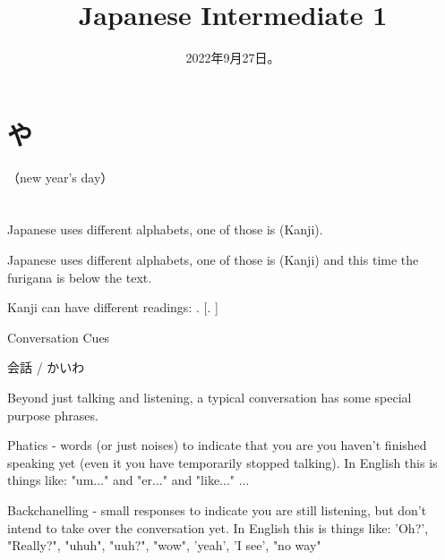 \documentclass[44pt, oneside]{article}   	%
\title{Japanese Intermediate 1}
\date{ \fg{漢字}{かんじ} 2022年9月27日。}
\newcommand{\TUG}{\TeX\ Users Group}
\begin{document}
\maketitle{}

\section*{\protect {}や}

（new year's day）







\section*{\protect {}}

Japanese uses different alphabets, one of those is  (Kanji).

Japanese uses different alphabets, one of those is  (Kanji) and this time the furigana is below the text.

Kanji can have different readings: .   [.  \?  ]

Conversation Cues

会話 / かいわ   

Beyond just talking and listening, a typical conversation has some special purpose phrases.

Phatics - words (or just noises) to indicate that you are you haven't finished speaking yet (even it you have temporarily stopped talking).  In English this is things like: "um..." and "er..." and "like..." ... 

Backchanelling - small responses to indicate you are still listening, but don't intend to take over the conversation yet.  In English this is things like: 'Oh?', "Really?", "uhuh", "uuh?", "wow", 'yeah', 'I see', "no way"
\end{document}
